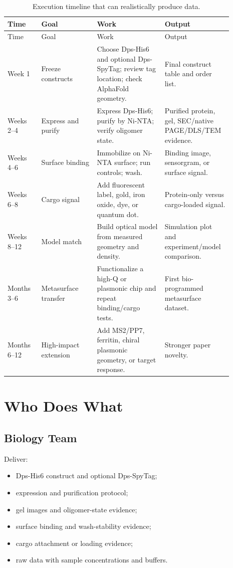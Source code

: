 \documentclass[11pt]{article}
\newcommand{\af}{AlphaFold}
\begin{document}
\begin{longtable}{p{0.14\linewidth}p{0.23\linewidth}p{0.28\linewidth}p{0.24\linewidth}}
\caption{Execution timeline that can realistically produce data.}\\
\toprule
Time & Goal & Work & Output \\
\midrule
\endfirsthead
\toprule
Time & Goal & Work & Output \\
\midrule
\endhead
Week 1 & Freeze constructs & Choose Dps-His6 and optional Dps-SpyTag; review tag location; check \af{} geometry. & Final construct table and order list. \\
Weeks 2--4 & Express and purify & Express Dps-His6; purify by Ni-NTA; verify oligomer state. & Purified protein, gel, SEC/native PAGE/DLS/TEM evidence. \\
Weeks 4--6 & Surface binding & Immobilize on Ni-NTA surface; run controls; wash. & Binding image, sensorgram, or surface signal. \\
Weeks 6--8 & Cargo signal & Add fluorescent label, gold, iron oxide, dye, or quantum dot. & Protein-only versus cargo-loaded signal. \\
Weeks 8--12 & Model match & Build optical model from measured geometry and density. & Simulation plot and experiment/model comparison. \\
Months 3--6 & Metasurface transfer & Functionalize a high-Q or plasmonic chip and repeat binding/cargo tests. & First bio-programmed metasurface dataset. \\
Months 6--12 & High-impact extension & Add MS2/PP7, ferritin, chiral plasmonic geometry, or target response. & Stronger paper novelty. \\
\bottomrule
\end{longtable}

\section{Who Does What}

\subsection{Biology Team}

Deliver:

\begin{itemize}
\item Dps-His6 construct and optional Dps-SpyTag;
\item expression and purification protocol;
\item gel images and oligomer-state evidence;
\item surface binding and wash-stability evidence;
\item cargo attachment or loading evidence;
\item raw data with sample concentrations and buffers.
\end{itemize}
\end{document}
